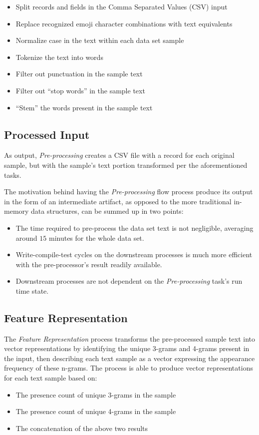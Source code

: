 \documentclass[conference]{sig-alternate-05-2015}
\begin{document}
\begin{itemize}
  \item Split records and fields in the Comma Separated Values (CSV) input
  \item Replace recognized emoji character combinations with text equivalents
  \item Normalize case in the text within each data set sample
  \item Tokenize the text into words
  \item Filter out punctuation in the sample text
  \item Filter out ``stop words'' in the sample text
  \item ``Stem'' the words present in the sample text
\end{itemize}

\subsection{Processed Input}\label{subsec:processed_input}
As output, \textit{Pre-processing} creates a CSV file with a record for each
original sample, but with the sample's text portion transformed per the
aforementioned tasks.

The motivation behind having the \textit{Pre-processing} flow process produce
its output in the form of an intermediate artifact, as opposed to the more
traditional in-memory data structures, can be summed up in two points:
\begin{itemize}
  \item The time required to pre-process the data set text is not negligible,
  averaging around $15$ minutes for the whole data set.
  \item Write-compile-test cycles on the downstream processes is much more
  efficient with the pre-processor's result readily available.
  \item Downstream processes are not dependent on the \textit{Pre-processing}
  task's run time state.
\end{itemize}

\subsection{Feature Representation}\label{subsec:feature_rep}
The \textit{Feature Representation} process transforms the pre-processed sample
text into vector representations by identifying the unique 3-grams and 4-grams
present in the input, then describing each text sample as a vector expressing
the appearance frequency of these n-grams. The process is able to produce
vector representations for each text sample based on:
\begin{itemize}
  \item The presence count of unique 3-grams in the sample
  \item The presence count of unique 4-grams in the sample
  \item The concatenation of the above two results
\end{itemize}
\end{document}
